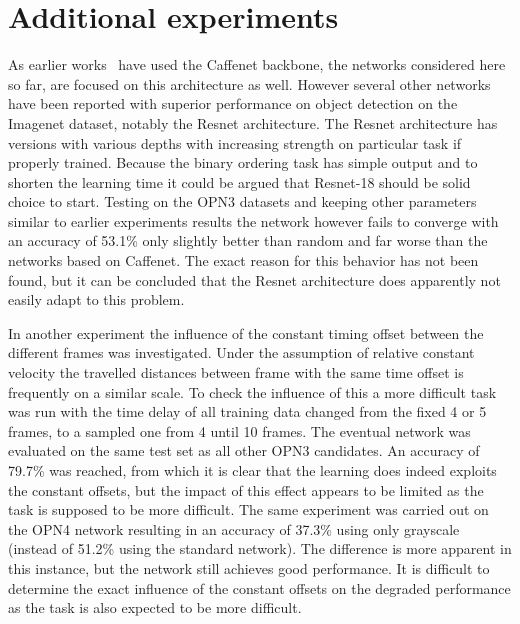 \section{Additional experiments}
As earlier works~\cite{misra2016,lee2017} have used the Caffenet backbone, the networks considered here so far, are focused on this architecture as well. However several other networks have been reported with superior performance on object detection on the Imagenet dataset, notably the Resnet architecture\cite{he2016}. The Resnet architecture has versions with various depths with increasing strength on particular task if properly trained. Because the binary ordering task has simple output and to shorten the learning time it could be argued that Resnet-18 should be solid choice to start. Testing on the OPN3 datasets and keeping other parameters similar to earlier experiments results the network however fails to converge with an accuracy of 53.1\% only slightly better than random and far worse than the networks based on Caffenet. The exact reason for this behavior has not been found, but it can be concluded that the Resnet architecture does apparently not easily adapt to this problem.

In another experiment the influence of the constant timing offset between the different frames was investigated. Under the assumption of relative constant velocity the travelled distances between frame with the same time offset is frequently on a similar scale. To check the influence of this a more difficult task was run with the time delay of all training data changed from the fixed 4 or 5 frames, to a sampled one from 4 until 10 frames. The eventual network was evaluated on the same test set as all other OPN3 candidates. An accuracy of 79.7\% was reached, from which it is clear that the learning does indeed exploits the constant offsets, but the impact of this effect appears to be limited as the task is supposed to be more difficult. The same experiment was carried out on the OPN4 network resulting in an accuracy of 37.3\% using only grayscale (instead of 51.2\% using the standard network). The difference is more apparent in this instance, but the network still achieves good performance. It is difficult to determine the exact influence of the constant offsets on the degraded performance as the task is also expected to be more difficult. 

